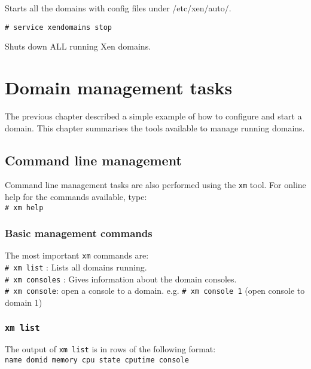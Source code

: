 \documentclass[11pt,twoside,final,openright]{xenstyle}
\begin{document}
Starts all the domains with config files under /etc/xen/auto/.

\verb_# service xendomains stop_

Shuts down ALL running Xen domains.


\chapter{Domain management tasks}

The previous chapter described a simple example of how to configure
and start a domain.  This chapter summarises the tools available to
manage running domains.

\section{Command line management}

Command line management tasks are also performed using the {\tt xm}
tool.  For online help for the commands available, type:\\
\verb_# xm help_

\subsection{Basic management commands}

The most important {\tt xm} commands are: \\
\verb_# xm list_ : Lists all domains running. \\
\verb_# xm consoles_ : Gives information about the domain consoles. \\
\verb_# xm console_: open a console to a domain.
e.g. \verb_# xm console 1_ (open console to domain 1)

\subsection{\tt xm list}

The output of {\tt xm list} is in rows of the following format:\\
\verb_name domid memory cpu state cputime console_
\end{document}
